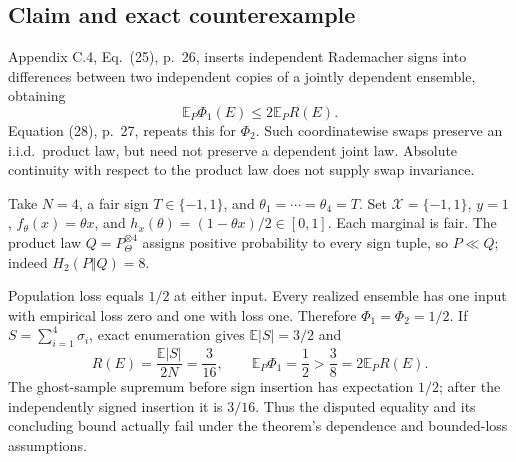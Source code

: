 \documentclass[10pt]{article}
\begin{document}
\subsection*{Claim and exact counterexample}
Appendix C.4, Eq. (25), p. 26, inserts independent Rademacher signs into differences between two independent copies of a jointly dependent ensemble, obtaining \[\mathbb E_P\Phi_1(E)\le2\mathbb E_P R(E).\] Equation (28), p. 27, repeats this for \(\Phi_2\). Such coordinatewise swaps preserve an i.i.d. product law, but need not preserve a dependent joint law. Absolute continuity with respect to the product law does not supply swap invariance.\par
Take \(N=4\), a fair sign \(T\in\{-1,1\}\), and \(\theta_1=\cdots=\theta_4=T\). Set \(\mathcal X=\{-1,1\}\), \(y=1\), \(f_\theta(x)=\theta x\), and \(h_x(\theta)=(1-\theta x)/2\in[0,1]\). Each marginal is fair. The product law \(Q=P_\Theta^{\otimes4}\) assigns positive probability to every sign tuple, so \(P\ll Q\); indeed \(H_2(P\Vert Q)=8\).\par
Population loss equals \(1/2\) at either input. Every realized ensemble has one input with empirical loss zero and one with loss one. Therefore \(\Phi_1=\Phi_2=1/2\). If \(S=\sum_{i=1}^4\sigma_i\), exact enumeration gives \(\mathbb E|S|=3/2\) and \[R(E)=\frac{\mathbb E|S|}{2N}=\frac3{16},\qquad
 \mathbb E_P\Phi_1=\frac12>\frac38=2\mathbb E_P R(E).\] The ghost-sample supremum before sign insertion has expectation \(1/2\); after the independently signed insertion it is \(3/16\). Thus the disputed equality and its concluding bound actually fail under the theorem’s dependence and bounded-loss assumptions.\par
\end{document}
